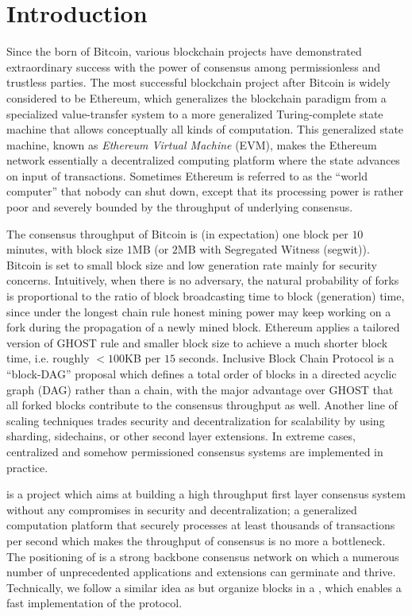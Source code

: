 

\section{Introduction}


Since the born of Bitcoin, various blockchain projects have demonstrated extraordinary success with the power of consensus among permissionless and trustless parties.
The most successful blockchain project after Bitcoin is widely considered to be Ethereum, which generalizes the blockchain paradigm from a specialized value-transfer system to a more generalized Turing-complete state machine that allows conceptually all kinds of computation.
This generalized state machine, known as \emph{Ethereum Virtual Machine} (EVM), makes the Ethereum network essentially a decentralized computing platform 
where the state advances on input of transactions.
Sometimes Ethereum is referred to as the ``world computer'' that nobody can shut down, 
except that its processing power is rather poor and severely bounded by the throughput of underlying consensus.

The consensus throughput of Bitcoin is (in expectation) one block per $10$ minutes, with block size $1$MB (or $2$MB with Segregated Witness (segwit)).
Bitcoin is set to small block size and low generation rate mainly for security concerns.
Intuitively, when there is no adversary, the natural probability of forks is proportional to the ratio of  block broadcasting time to block (generation) time,
since under the longest chain rule honest mining power may keep working on a fork during the propagation of a newly mined block.
Ethereum applies a tailored version of GHOST rule \cite{GHOST} and smaller block size to achieve a much shorter block time, i.e. roughly $<100$KB per $15$ seconds.
Inclusive Block Chain Protocol \cite{Inclusive} is a ``block-DAG'' proposal which defines a total order of blocks in a directed acyclic graph (DAG) rather than a chain, with the major advantage over GHOST that all forked blocks contribute to the consensus throughput as well. 
Another line of scaling techniques trades security and decentralization for scalability by using sharding, sidechains, or other second layer extensions.
In extreme cases, centralized and somehow permissioned consensus systems are implemented in practice.


{\name} is a project which aims at building a high throughput first layer consensus system without any compromises in security and decentralization; a generalized computation platform that securely processes at least thousands of transactions per second which makes the  throughput of consensus is no more a bottleneck.
The positioning of {\name} is a strong backbone consensus network on which a numerous number of unprecedented applications and extensions can germinate and thrive.
Technically, we follow a similar idea as \cite{Inclusive} but organize blocks in a \tg, 
which enables a fast implementation of the {\name} protocol.